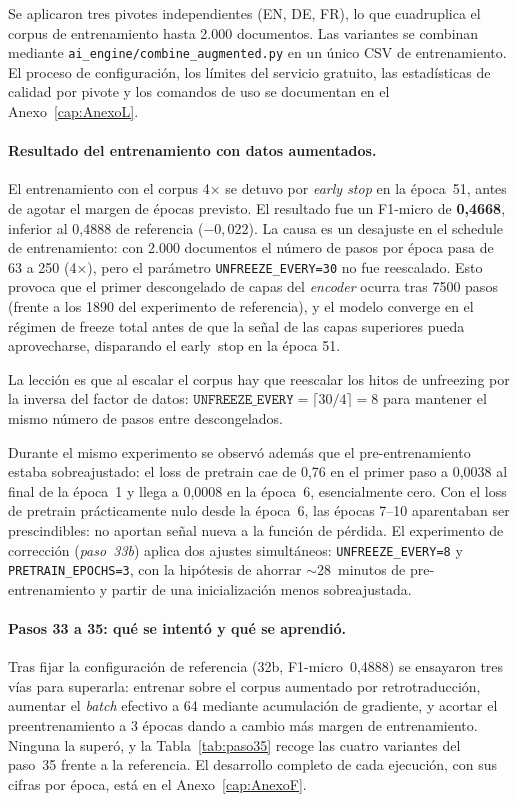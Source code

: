 Se aplicaron tres pivotes independientes (EN, DE, FR), lo que cuadruplica el corpus de entrenamiento hasta 2.000 documentos. Las variantes se combinan mediante \texttt{ai\_engine/combine\_augmented.py} en un único CSV de entrenamiento. El proceso de configuración, los límites del servicio gratuito, las estadísticas de calidad por pivote y los comandos de uso se documentan en el Anexo~\ref{cap:AnexoL}.

\paragraph{Resultado del entrenamiento con datos aumentados.}
El entrenamiento con el corpus 4× se detuvo por \emph{early stop} en la época~51, antes de agotar el margen de épocas previsto. El resultado fue un F1-micro de \textbf{0,4668}, inferior al 0,4888 de referencia ($-0{,}022$). La causa es un desajuste en el schedule de entrenamiento: con 2.000 documentos el número de pasos por época pasa de 63 a 250 (4×), pero el parámetro \texttt{UNFREEZE\_EVERY=30} no fue reescalado. Esto provoca que el primer descongelado de capas del \emph{encoder} ocurra tras 7500 pasos (frente a los 1890 del experimento de referencia), y el modelo converge en el régimen de freeze total antes de que la señal de las capas superiores pueda aprovecharse, disparando el early~stop en la época 51.

La lección es que al escalar el corpus hay que reescalar los hitos de unfreezing por la inversa del factor de datos: $\texttt{UNFREEZE\_EVERY} = \lceil 30 / 4 \rceil = 8$ para mantener el mismo número de pasos entre descongelados.

Durante el mismo experimento se observó además que el pre-entrenamiento estaba sobreajustado: el loss de pretrain cae de 0,76 en el primer paso a 0,0038 al final de la época~1 y llega a 0,0008 en la época~6, esencialmente cero. Con el loss de pretrain prácticamente nulo desde la época~6, las épocas 7--10 aparentaban ser prescindibles: no aportan señal nueva a la función de pérdida. El experimento de corrección (\emph{paso~33b}) aplica dos ajustes simultáneos: \texttt{UNFREEZE\_EVERY=8} y \texttt{PRETRAIN\_EPOCHS=3}, con la hipótesis de ahorrar $\sim$28~minutos de pre-entrenamiento y partir de una inicialización menos sobreajustada.

\paragraph{Pasos 33 a 35: qué se intentó y qué se aprendió.}
Tras fijar la configuración de referencia (32b, F1-micro~0,4888) se ensayaron tres vías para superarla: entrenar sobre el corpus aumentado por retrotraducción, aumentar el \emph{batch} efectivo a 64 mediante acumulación de gradiente, y acortar el preentrenamiento a 3 épocas dando a cambio más margen de entrenamiento. Ninguna la superó, y la Tabla~\ref{tab:paso35} recoge las cuatro variantes del paso~35 frente a la referencia. El desarrollo completo de cada ejecución, con sus cifras por época, está en el Anexo~\ref{cap:AnexoF}.

